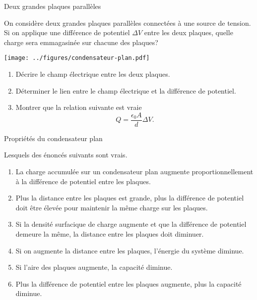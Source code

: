 \documentclass{beamer}
\begin{document}
\begin{frame}{Deux grandes plaques parallèles}

On considère deux grandes plaques parallèles connectées à une source de
tension.  Si on applique une différence de potentiel $\Delta V$ entre les deux
plaques, quelle charge sera emmagasinée sur chacune des plaques?

\begin{center}
  \texttt{[image: ../figures/condensateur-plan.pdf]}
\end{center}

\begin{enumerate}
  \item Décrire le champ électrique entre les deux plaques.
  \item Déterminer le lien entre le champ électrique et la différence de
    potentiel.
  \item Montrer que la relation suivante est vraie
    $$Q = \frac{\epsilon_0 A}{d} \Delta V.$$
\end{enumerate}

\end{frame}


\begin{frame}[t]{Propriétés du condensateur plan}

Lesquels des énoncés suivants sont vrais.

\begin{enumerate}
  \item La charge accumulée sur un condensateur plan augmente
    proportionnellement à la différence de potentiel entre les plaques.
  \item Plus la distance entre les plaques est grande, plus la différence de
    potentiel doit être élevée pour maintenir la même charge sur les plaques.
  \item Si la densité surfacique de charge augmente et que la différence de
    potentiel demeure la même, la distance entre les plaques doit diminuer.
  \item Si on augmente la distance entre les plaques, l'énergie du système
    diminue.
  \item Si l'aire des plaques augmente, la capacité diminue.
  \item Plus la différence de potentiel entre les plaques augmente, plus la
    capacité diminue.
\end{enumerate}

\end{frame}
\end{document}

